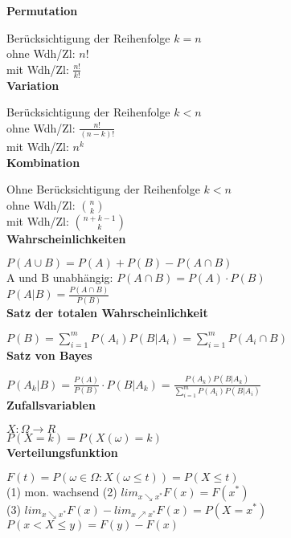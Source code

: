\documentclass[10pt,twocolumn,a4paper]{article}
\begin{document}
\begin{flushleft}

\textbf{Permutation}

Berücksichtigung der Reihenfolge $k=n$\\
ohne Wdh/Zl: $n!$\\
mit Wdh/Zl: $\frac{n!}{k!}$\\

\textbf{Variation}

Berücksichtigung der Reihenfolge $k < n$\\
ohne Wdh/Zl: $\frac{n!}{(n-k)!}$\\
mit Wdh/Zl: $n^k$\\

\textbf{Kombination}

Ohne Berücksichtigung der Reihenfolge $k < n$\\
ohne Wdh/Zl: $\binom{n}{k}$\\
mit Wdh/Zl: $\binom{n+k-1}{k}$\\

\textbf{Wahrscheinlichkeiten}

$P(A \cup B) = P(A) + P(B) - P(A \cap B)$\\
A und B unabhängig: $P(A \cap B) = P(A) \cdot P(B)$\\
$P(A|B) = \frac{P(A \cap B)}{P(B)}$\\

\textbf{Satz der totalen Wahrscheinlichkeit}

$P(B) = \sum_{i=1}^m P(A_i) P(B|A_i) = \sum_{i=1}^m P(A_i \cap B)$\\

\textbf{Satz von Bayes}

$P(A_k|B) = \frac{P(A)}{P(B)} \cdot P(B|A_k) = \frac{P(A_k) P(B|A_k)}{\sum_{i=1}^m P(A_i) P(B|A_i)}$\\

\textbf{Zufallsvariablen}

$X: \Omega \rightarrow R$\\
$P(X=k) = P(X(\omega)=k)$\\

\textbf{Verteilungsfunktion}

$F(t) = P({\omega \in \Omega: X(\omega \leq t)}) = P(X \leq t)$\\
(1) mon. wachsend (2) $lim_{x\searrow x^*}F(x)=F(x^*)$\\
(3) $lim_{x\searrow x^*}F(x)-lim_{x\nearrow x^*}F(x)=P(X=x^*)$\\
$P(x < X \leq y) = F(y) - F(x)$\\


\end{flushleft}
\end{document}
